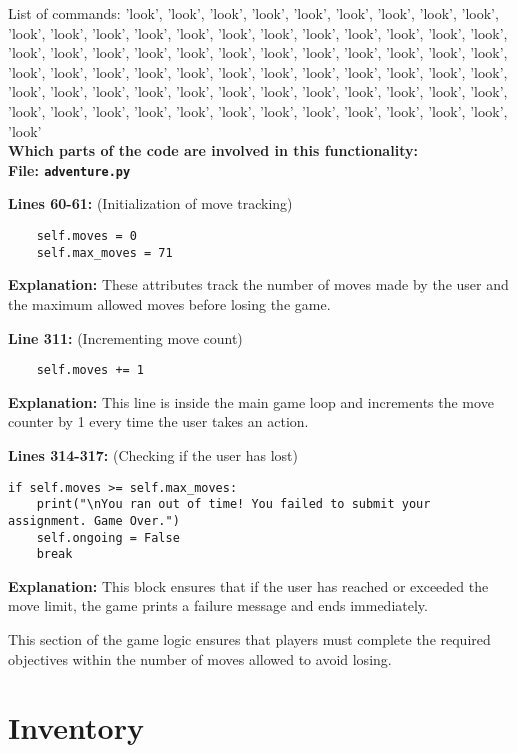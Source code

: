 \documentclass[11pt]{article}
\begin{document}
List of commands:
'look', 'look', 'look', 'look', 'look', 'look', 'look', 'look', 'look', 'look', 'look', 'look', 'look', 'look', 'look',
'look', 'look', 'look', 'look', 'look', 'look', 'look', 'look', 'look', 'look', 'look', 'look', 'look', 'look', 'look',
'look', 'look', 'look', 'look', 'look', 'look', 'look', 'look', 'look', 'look', 'look', 'look', 'look', 'look', 'look',
'look', 'look', 'look', 'look', 'look', 'look', 'look', 'look', 'look', 'look', 'look', 'look', 'look', 'look', 'look',
'look', 'look', 'look', 'look', 'look', 'look', 'look', 'look', 'look', 'look' \\
\textbf{Which parts of the code are involved in this functionality:} \\

\textbf{File: \texttt{adventure.py}}

\noindent\textbf{Lines 60-61:} (Initialization of move tracking)
\begin{verbatim}
    self.moves = 0
    self.max_moves = 71
\end{verbatim}
\textbf{Explanation:} These attributes track the number of moves made by the user and the maximum allowed moves before
losing the game.

\noindent\textbf{Line 311:} (Incrementing move count)
\begin{verbatim}
    self.moves += 1
\end{verbatim}
\textbf{Explanation:} This line is inside the main game loop and increments the move counter by 1 every time the user
takes an action.

\noindent\textbf{Lines 314-317:} (Checking if the user has lost)
\begin{verbatim}
if self.moves >= self.max_moves:
    print("\nYou ran out of time! You failed to submit your assignment. Game Over.")
    self.ongoing = False
    break
\end{verbatim}
\textbf{Explanation:} This block ensures that if the user has reached or exceeded the move limit, the game prints a
failure message and ends immediately.

This section of the game logic ensures that players must complete the required objectives within the number of moves
allowed to avoid losing.

\section*{Inventory}
\end{document}

